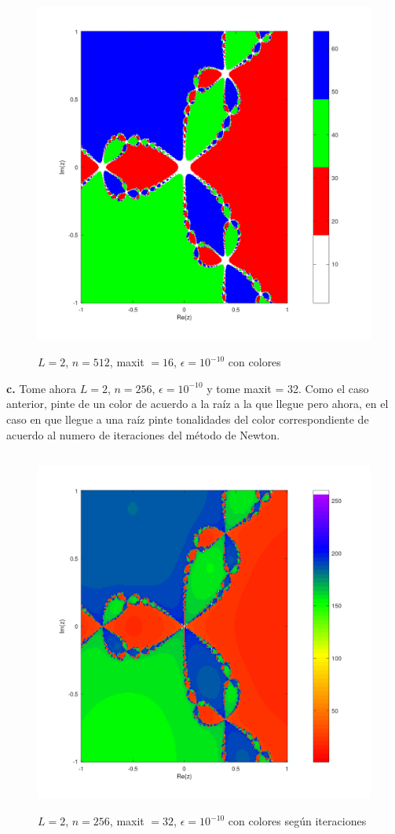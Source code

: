 \documentclass{article} %
\begin{document}
\begin{figure}[H]
    \centering
    \includegraphics[width=152mm, height=120mm]{images/L2n512maxit16e10-10color.png}
    \caption{$L=2$, $n=512$, maxit $=16$, $\epsilon=10^{-10}$ con colores}
\end{figure}

\newpage

\textbf{c.} Tome ahora $L=2$, $n=256$, $\epsilon=10^{-10}$ y tome maxit = 32. Como el caso anterior, pinte de un color de acuerdo a la raíz a la que llegue pero ahora, en el caso en que llegue a una raíz pinte tonalidades del color correspondiente de acuerdo al numero de iteraciones del método de Newton.

\begin{figure}[H]
    \centering
    \includegraphics[width=152mm, height=120mm]{images/L2n256maxit32e10-10colordegradado.png}
    \caption{$L=2$, $n=256$, maxit $=32$, $\epsilon=10^{-10}$ con colores según iteraciones}
\end{figure}
\end{document}
